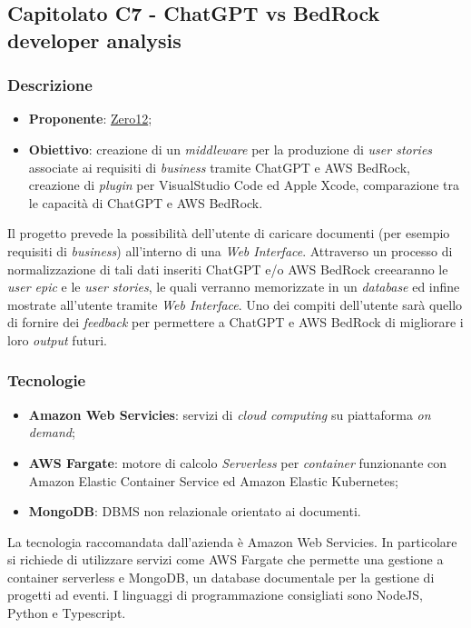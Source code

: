 \subsection{Capitolato C7 - ChatGPT vs BedRock developer analysis}


\subsubsection{Descrizione}
\begin{itemize}
    \item \textbf{Proponente}: \href{https://www.zero12.it/}{Zero12};
    \item \textbf{Obiettivo}: creazione di un \textit{middleware} per la produzione di \textit{user stories} associate ai requisiti di \textit{business} tramite ChatGPT e AWS BedRock, creazione di \textit{plugin} per VisualStudio Code ed Apple Xcode, comparazione tra le capacità di ChatGPT e AWS BedRock.
\end{itemize}
Il progetto prevede la possibilità dell'utente di caricare documenti (per esempio requisiti di \textit{business}) all'interno di una \textit{Web Interface}. 
Attraverso un processo di normalizzazione di tali dati inseriti ChatGPT e/o AWS BedRock creearanno le \textit{user epic} e le \textit{user stories}, le quali verranno memorizzate in un \textit{database} ed infine mostrate all'utente tramite \textit{Web Interface}.
Uno dei compiti dell'utente sarà quello di fornire dei \textit{feedback} per permettere a ChatGPT e AWS BedRock di migliorare i loro \textit{output} futuri.


\subsubsection{Tecnologie}
\begin{itemize}
    \item \textbf{Amazon Web Servicies}: servizi di \textit{cloud computing} su piattaforma \textit{on demand};
    \item \textbf{AWS Fargate}: motore di calcolo \textit{Serverless} per \textit{container} funzionante con Amazon Elastic Container Service ed Amazon Elastic Kubernetes;
    \item \textbf{MongoDB}: DBMS non relazionale orientato ai documenti.
\end{itemize}
La tecnologia raccomandata dall'azienda è Amazon Web Servicies. 
In particolare si richiede di utilizzare servizi come AWS Fargate che permette una gestione a container serverless e MongoDB, un database documentale per la gestione di progetti ad eventi.
I linguaggi di programmazione consigliati sono NodeJS, Python e Typescript.


